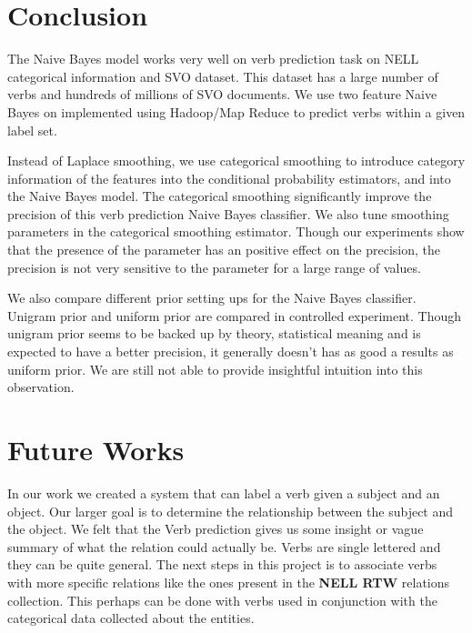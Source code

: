 \section{Conclusion}

The Naive Bayes model works very well on verb prediction task on NELL categorical information and SVO dataset. This dataset has a large number of verbs and hundreds of millions of SVO documents. We use two feature Naive Bayes on implemented using Hadoop/Map Reduce to predict verbs within a given label set. 

Instead of Laplace smoothing, we use categorical smoothing to introduce category information of the features into the conditional probability estimators, and into the Naive Bayes model. The categorical smoothing significantly improve the precision of this verb prediction Naive Bayes classifier. We also tune smoothing parameters in the categorical smoothing estimator. Though our experiments show that the presence of the parameter has an positive effect on the precision, the precision is not very sensitive to the parameter for a large range of values.

We also compare different prior setting ups for the Naive Bayes classifier. Unigram prior and uniform prior are compared in controlled experiment. Though unigram prior seems to be backed up by theory, statistical meaning and is expected to have a better precision, it generally doesn't has as good a results as uniform prior. We are still not able to provide insightful intuition into this observation.

\section{Future Works}

In our work we created a system that can label a verb given a subject and an object. Our larger goal is to determine the relationship between the subject and the object. We felt that the Verb prediction gives us some insight or vague summary of what the relation could actually be. Verbs are single lettered and they can be quite general. The next steps in this project is to associate verbs with more specific relations like the ones present in the \textbf{NELL RTW} relations collection. This perhaps can be done with verbs used in conjunction with the categorical data collected about the entities.

